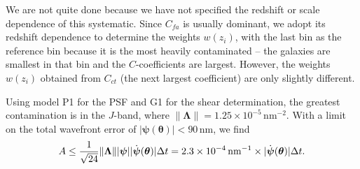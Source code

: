 We are not quite done because we have not specified the redshift or scale dependence of this systematic. Since $C_{fa}$ is usually dominant, we adopt its redshift dependence to determine the weights $w(z_i)$, with the last bin as the reference bin because it is the most heavily contaminated -- the galaxies are smallest in that bin and the $C$-coefficients are largest. However, the weights $w(z_i)$ obtained from $C_{ct}$ (the next largest coefficient) are only slightly different. 

Using model P1 for the PSF and G1 for the shear determination, the greatest contamination is in the $J$-band, where $\lVert{\boldsymbol\Lambda}\rVert = 1.25\times 10^{-5}\,$nm$^{-2}$. With a limit on the total wavefront error of $|{\boldsymbol\psi}({\boldsymbol\theta})|<90\,$nm, we find
\begin{equation}
A \le \frac1{\sqrt{24}}\lVert{\boldsymbol\Lambda} \rVert |{\boldsymbol\psi}| |\dot{\boldsymbol\psi}({\boldsymbol\theta})| \Delta t
= 2.3\times 10^{-4}\, {\rm nm}^{-1}\times |\dot{\boldsymbol\psi}({\boldsymbol\theta})| \Delta t.
\end{equation}


